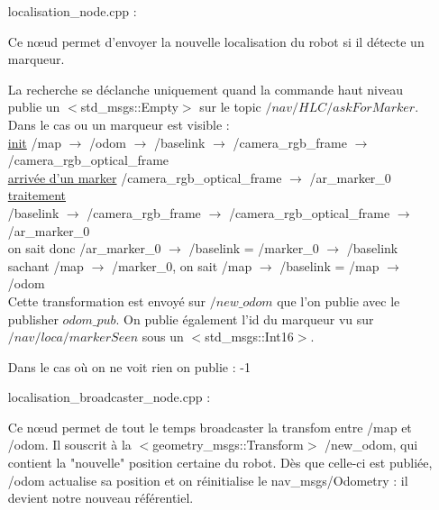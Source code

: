 \documentclass[10pt,a4paper]{article}
\begin{document}
\begin{itemize}

\item [localisation\_node.cpp] :

Ce nœud permet d'envoyer la nouvelle localisation du robot si il détecte un marqueur. 

\noindent La recherche se déclanche uniquement quand la commande haut niveau publie un $<$std\_msgs::Empty$>$ sur le topic $/nav/HLC/askForMarker$. \\

Dans le cas ou un marqueur est visible : \\
\noindent \underline{init} 
/map $\rightarrow$ /odom $\rightarrow$ /baselink $\rightarrow$ /camera\_rgb\_frame $\rightarrow$ /camera\_rgb\_optical\_frame \\
\noindent \underline{arrivée d'un marker} 
/camera\_rgb\_optical\_frame $\rightarrow$ /ar\_marker\_0 \\
\noindent \underline{traitement} \\
\indent /baselink $\rightarrow$ /camera\_rgb\_frame $\rightarrow$ /camera\_rgb\_optical\_frame $\rightarrow$ /ar\_marker\_0 \\
\indent on sait donc /ar\_marker\_0 $\rightarrow$ /baselink 
= /marker\_0 $\rightarrow$ /baselink \\
\indent sachant /map $\rightarrow$ /marker\_0, on sait /map $\rightarrow$ /baselink = /map  $\rightarrow$ /odom \\

\noindent Cette transformation est envoyé sur $/new\_odom$ que l'on publie avec le publisher $odom\_pub$. On publie également l'id du marqueur vu sur $/nav/loca/markerSeen$ sous un $<$std\_msgs::Int16$>$. 

Dans le cas où on ne voit rien on publie : -1 \\

\item [localisation\_broadcaster\_node.cpp] :

Ce nœud permet de tout le temps broadcaster la transfom entre /map et /odom. Il souscrit à la $<$geometry\_msgs::Transform$>$ /new\_odom, qui contient la "nouvelle" position certaine du robot. Dès que celle-ci est publiée, /odom actualise sa position et on réinitialise le nav\_msgs/Odometry : il devient notre nouveau référentiel.
\end{itemize}
\end{document}
